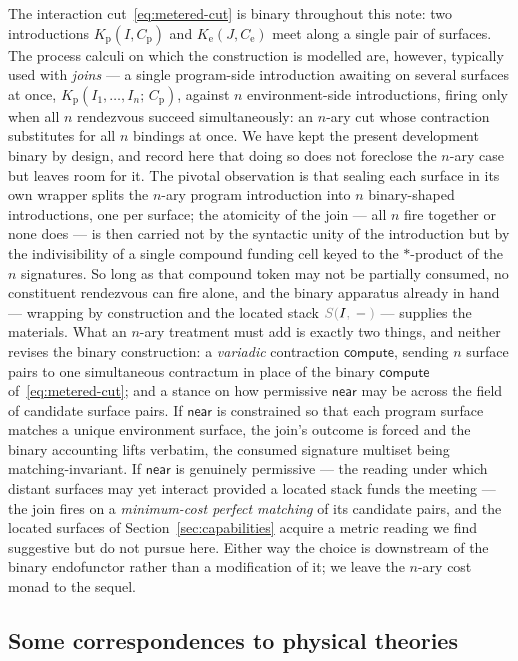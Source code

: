 \documentclass[11pt]{article}
\theoremstyle{definition}
\theoremstyle{plain}
\newcommand{\dec}[1]{\textcolor{costgray}{#1}}   %
\newcommand{\near}{\mathsf{near}}
\newcommand{\lstk}[2]{\dec{S(}{#1}\dec{,}\,#2\dec{)}}  %
\newcommand{\compute}{\mathsf{compute}}
\newcommand{\Kp}{K_{\mathrm{p}}}
\newcommand{\Ke}{K_{\mathrm{e}}}
\begin{document}
The interaction cut~\eqref{eq:metered-cut} is binary throughout this
note: two introductions $\Kp(I,C_{\mathrm p})$ and $\Ke(J,C_{\mathrm e})$
meet along a single pair of surfaces. The process calculi on which the
construction is modelled are, however, typically used with \emph{joins}
--- a single program-side introduction awaiting on several surfaces at
once, $\Kp(I_1,\dots,I_n;\,C_{\mathrm p})$, against $n$ environment-side
introductions, firing only when all $n$ rendezvous succeed
simultaneously: an $n$-ary cut whose contraction substitutes for all $n$
bindings at once. We have kept the present development binary by design,
and record here that doing so does not foreclose the $n$-ary case but
leaves room for it. The pivotal observation is that sealing each surface
in its own wrapper splits the $n$-ary program introduction into $n$
binary-shaped introductions, one per surface; the atomicity of the join
--- all $n$ fire together or none does --- is then carried not by the
syntactic unity of the introduction but by the indivisibility of a single
compound funding cell keyed to the $*$-product of the $n$ signatures. So
long as that compound token may not be partially consumed, no constituent
rendezvous can fire alone, and the binary apparatus already in hand ---
wrapping by construction and the located stack $\lstk{I}{-}$ --- supplies
the materials. What an $n$-ary treatment must add is exactly two things,
and neither revises the binary construction: a \emph{variadic}
contraction $\compute$, sending $n$ surface pairs to one simultaneous
contractum in place of the binary $\compute$ of~\eqref{eq:metered-cut};
and a stance on how permissive $\near$ may be across the field of
candidate surface pairs. If $\near$ is constrained so that each program
surface matches a unique environment surface, the join's outcome is
forced and the binary accounting lifts verbatim, the consumed signature
multiset being matching-invariant. If $\near$ is genuinely permissive ---
the reading under which distant surfaces may yet interact provided a
located stack funds the meeting --- the join fires on a
\emph{minimum-cost perfect matching} of its candidate pairs, and the
located surfaces of Section~\ref{sec:capabilities} acquire a metric
reading we find suggestive but do not pursue here. Either way the choice
is downstream of the binary endofunctor rather than a modification of it;
we leave the $n$-ary cost monad to the sequel.

\subsection*{Some correspondences to physical theories}
\end{document}
